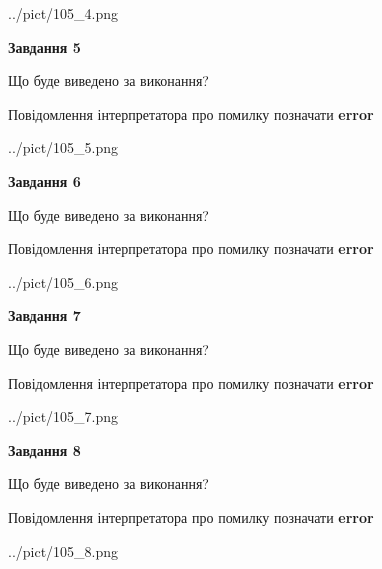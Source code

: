\documentclass[12pt, ukrainian]{article}
\begin{document}
{\begin{center}
	{../pict/105_4.png}
\end{center}
\newpage

{\begin {center}\textbf{Завдання 5}\end {center}}\par
Що буде виведено за виконання? \par
Повідомлення інтерпретатора про помилку позначати \textbf{error}

\begin{center}
	{../pict/105_5.png}
\end{center}
\newpage

{\begin {center}\textbf{Завдання 6}\end {center}}\par
Що буде виведено за виконання? \par
Повідомлення інтерпретатора про помилку позначати \textbf{error}

\begin{center}
	{../pict/105_6.png}
\end{center}
\newpage

{\begin {center}\textbf{Завдання 7}\end {center}}\par
Що буде виведено за виконання? \par
Повідомлення інтерпретатора про помилку позначати \textbf{error}

\begin{center}
	{../pict/105_7.png}
\end{center}
\newpage

{\begin {center}\textbf{Завдання 8}\end {center}}\par
Що буде виведено за виконання? \par
Повідомлення інтерпретатора про помилку позначати \textbf{error}

\begin{center}
	{../pict/105_8.png}
\end{center}
\newpage

}
\end{document}
